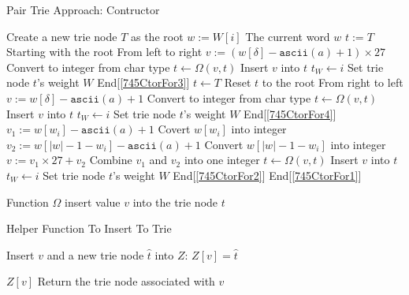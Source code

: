 \documentclass[a4paper,12pt]{article}
\begin{document}
\begin{algorithm}[H]
\caption{Pair Trie Approach: Contructor}
\begin{algorithmic}[1]
\State Create a new trie node $T$ as the root
 \label{745CtorFor1}
\State $w:=W[i]$ \Comment The current word $w$
 \label{745CtorFor2}
\State $t:=T$ \Comment Starting with the root 
 \Comment From left to right \label{745CtorFor3}
\State $ v:= (w[\delta] - \texttt{ascii}(a) + 1)\times 27$ \Comment Convert to integer from char type \label{745algonote1}
\State $t\gets \Omega(v, t)$ \Comment Insert $v$ into $t$
\State $t_W \gets i$ \Comment Set trie node $t$'s weight $W$
\EndFor \Comment End[\ref{745CtorFor3}]
\State $t\gets T$ \Comment Reset $t$ to the root
 \Comment From right to left \label{745CtorFor4}
\State $ v:= w[\delta] - \texttt{ascii}(a) + 1$ \Comment Convert to integer from char type
\State $t\gets \Omega(v, t)$ \Comment Insert $v$ into $t$
\State $t_W \gets i$ \Comment Set trie node $t$'s weight $W$
\EndFor \Comment End[\ref{745CtorFor4}]
\State $v_1:= w[w_i] - \texttt{ascii}(a) + 1$ \Comment Covert $w[w_i]$ into integer
\State $v_2:= w[|w| - 1 - w_i] - \texttt{ascii}(a) + 1$ \Comment Convert $w[|w| - 1 - w_i]$ into integer
\State $v:=v_1\times 27+v_2$ \Comment Combine $v_1$ and $v_2$ into one integer \label{745algonote2}
\State $t\gets \Omega(v,t)$ \Comment Insert $v$  into $t$
\State $t_W \gets i$ \Comment Set trie node $t$'s weight $W$
\EndFor \Comment End[\ref{745CtorFor2}]
\EndFor \Comment End[\ref{745CtorFor1}]
\EndProcedure
\end{algorithmic}
\end{algorithm}

Function $\Omega$ insert value $v$ into the trie node $t$
\begin{algorithm}[H]
\caption{Helper Function To Insert To Trie}
\label{745insert}
\begin{algorithmic}[1]
\State Insert $v$ and a new trie node $\hat{t}$ into $Z$: $Z[v]=\hat{t}$
\EndIf
{}
\end{algorithmic}
\end{algorithm}
\begin{algorithm}[H]
\begin{algorithmic}[1]
\State \Return $Z[v]$ \Comment Return the trie node associated with $v$
\EndFunction
\end{algorithmic}
\end{algorithm}
\end{document}
